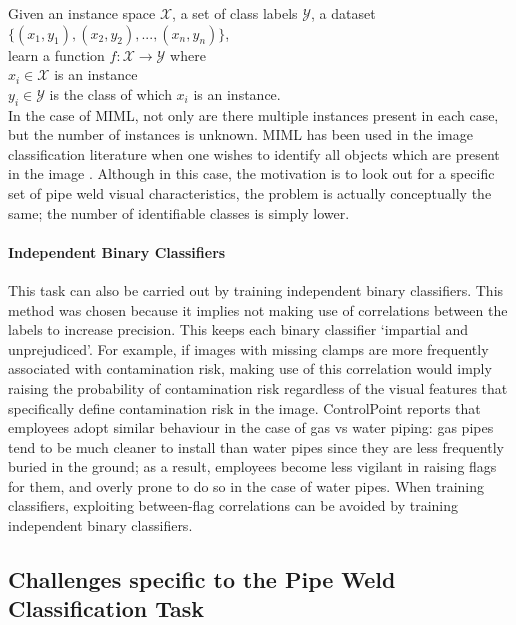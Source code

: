 \documentclass[a4paper,11pt]{article}
\begin{document}
\indent Given an instance space $\mathcal{X}$, a set of class labels $\mathcal{Y}$, a dataset $\{(x_{1},y_{1}),(x_{2},y_{2}), ..., (x_{n},y_{n})\}$,\\ 
\indent learn a function $f : \mathcal{X} \rightarrow \mathcal{Y}$ where\\  
\indent \indent $x_{i} \in \mathcal{X}$ is an instance \\   
\indent \indent $y_{	i} \in \mathcal{Y}$ is the class of which $x_{i}$ is an instance.\\

In the case of MIML, not only are there multiple instances present in each case, but the number of instances is unknown. MIML has been used in the image classification literature when one wishes to identify all objects which are present in the image \cite{MIML}. Although in this case, the motivation is to look out for a specific set of pipe weld visual characteristics, the problem is actually conceptually the same; the number of identifiable classes is simply lower. 

\paragraph{Independent Binary Classifiers}

This task can also be carried out by training independent binary classifiers. This method was chosen because it implies not making use of correlations between the labels to increase precision. This keeps each binary classifier `impartial and unprejudiced'. For example, if images with missing clamps are more frequently associated with contamination risk, making use of this correlation would imply raising the probability of contamination risk regardless of the visual features that specifically define contamination risk in the image. ControlPoint reports that employees adopt similar behaviour in the case of gas vs water piping: gas pipes tend to be much cleaner to install than water pipes since they are less frequently buried in the ground; as a result, employees become less vigilant in raising flags for them, and overly prone to do so in the case of water pipes. When training classifiers, exploiting between-flag correlations can be avoided by training independent binary classifiers.

\subsection{Challenges specific to the Pipe Weld Classification Task}
\end{document}
